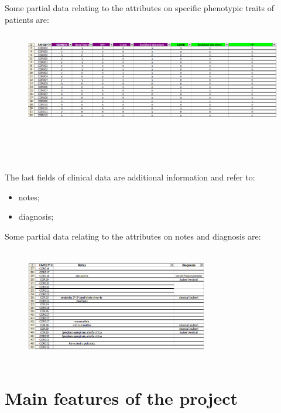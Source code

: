 \documentclass[a4paper]{report}
\begin{document}
Some partial data relating to the attributes on specific phenotypic traits of patients are:
\begin{figure}[hb]
\centering
\includegraphics[height=4.2cm, width=14cm]{attrTrattiFenotipici.jpg}
\end{figure}
\\ \\ \\
The last fields of clinical data are additional information and refer to:
\begin{itemize}
   \item notes;
   \item diagnosis;
\end{itemize}
Some partial data relating to the attributes on notes and diagnosis are:
\begin{figure}[hb]
\centering
\includegraphics[height=5cm, width=8cm]{attrNotes&Diagnosis.jpg}
\end{figure}

\chapter{Main features of the project}
\end{document}
